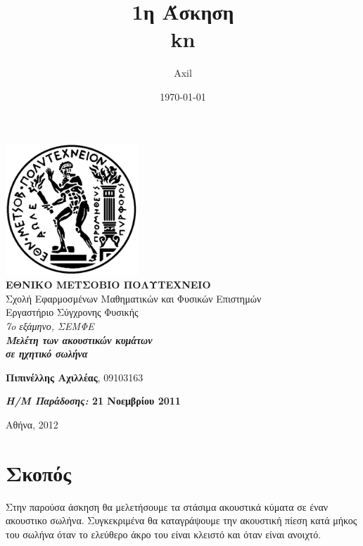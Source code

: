 \documentclass[a4paper,11pt,titlepage]{article}
\title{1η Άσκηση\\kn}
\author{Axil}
\date{\today}
\begin{document}
\pagestyle{headings}    %

\begin{titlepage}
\begin{center}
\includegraphics[width=50mm]{pyrforos.pdf}\\[0.5cm]
\textbf{\LARGE ΕΘΝΙΚΟ ΜΕΤΣΟΒΙΟ ΠΟΛΥΤΕΧΝΕΙΟ}\\
\textrm{\Large Σχολή Εφαρμοσμένων Μαθηματικών και Φυσικών Επιστημών}\\[2.0cm]
\Huge{Εργαστήριο Σύγχρονης Φυσικής}\\
\Large{\textit{7o εξάμηνο, ΣΕΜΦΕ}}\\[2.0cm]
\Large{\textit{\textbf{Μελέτη των ακουστικών κυμάτων \\ σε ηχητικό σωλήνα}}}\\[5.0cm]
\normalsize
\begin{minipage}{0.49\textwidth}
\begin{flushleft}
\textbf{Πιπινέλλης Αχιλλέας}, 09103163
\end{flushleft}
\end{minipage}
\begin{minipage}{0.49\textwidth}
\begin{flushright}
\textbf{\textit{Η/Μ Παράδοσης:} 21 Νοεμβρίου 2011}
\end{flushright}
\end{minipage}

\vfill
{Αθήνα, 2012}

\end{center}
\end{titlepage}

\section{Σκοπός}
Στην παρούσα άσκηση θα μελετήσουμε τα στάσιμα ακουστικά κύματα σε έναν ακουστικο σωλήνα. Συγκεκριμένα θα καταγράψουμε την ακουστική πίεση κατά μήκος του σωλήνα όταν το ελεύθερο άκρο του είναι κλειστό και όταν είναι ανοιχτό.
\end{document}
